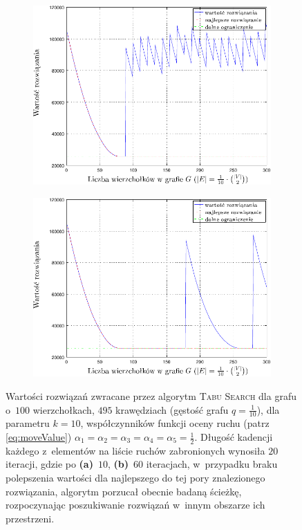 \begin{figure}[!htbp]
	\renewcommand\figurename{Wykres}
	\null\hfill
	\begin{subfigure}[b]{0.45\textwidth}
		\includegraphics[width=\textwidth]{Chapter_VI/RRIMST1-example/RRIMST1_psfrag}
		\caption{}
		\label{fig:rrimst1:a}
	\end{subfigure}
	\hfill
	\begin{subfigure}[b]{0.45\textwidth}
		\includegraphics[width=\textwidth]{Chapter_VI/RRIMST2-example/RRIMST2_psfrag}
		\caption{}
		\label{fig:rrimst1:b}
	\end{subfigure}
	\hfill\null
	\caption{
		Wartości rozwiązań zwracane przez algorytm \textsc{Tabu Search} dla grafu o~$100$ wierzchołkach, $495$ krawędziach (gęstość grafu $q = \frac{1}{10}$), dla parametru $k = 10$, współczynników funkcji oceny ruchu (patrz \ref{eq:moveValue}) $\alpha_{1} = \alpha_{2} = \alpha_{3} = \alpha_{4} = \alpha_{5} = \frac{1}{2}$.
		Długość kadencji każdego z~elementów na liście ruchów zabronionych wynosiła $20$ iteracji, gdzie po \textbf{(a)}~$10$, \textbf{(b)}~$60$ iteracjach, w~przypadku braku polepszenia wartości dla najlepszego do tej pory znalezionego rozwiązania, algorytm porzucał obecnie badaną ścieżkę, rozpoczynając poszukiwanie rozwiązań w~innym obszarze ich przestrzeni.
	}
\end{figure}

